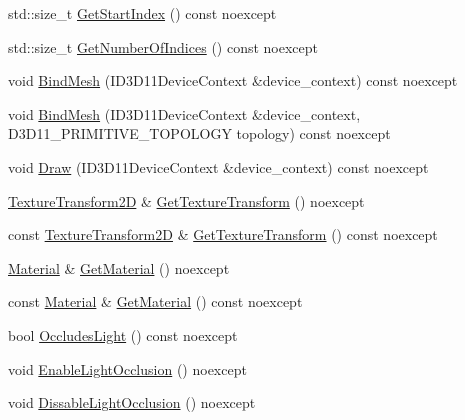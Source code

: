\begin{DoxyCompactItemize}
std\+::size\+\_\+t \mbox{\hyperlink{classmage_1_1rendering_1_1_model_a419dd6f4ea7f32ac3d165ce87d54fb47}{Get\+Start\+Index}} () const noexcept
\item 
std\+::size\+\_\+t \mbox{\hyperlink{classmage_1_1rendering_1_1_model_a4e8445480b07026d2f758d879c8c9d56}{Get\+Number\+Of\+Indices}} () const noexcept
\item 
void \mbox{\hyperlink{classmage_1_1rendering_1_1_model_a78defd61277c92a529c4811f1c7c391b}{Bind\+Mesh}} (I\+D3\+D11\+Device\+Context \&device\+\_\+context) const noexcept
\item 
void \mbox{\hyperlink{classmage_1_1rendering_1_1_model_a7793e3f1fa480cb4dc423845fc4de45f}{Bind\+Mesh}} (I\+D3\+D11\+Device\+Context \&device\+\_\+context, D3\+D11\+\_\+\+P\+R\+I\+M\+I\+T\+I\+V\+E\+\_\+\+T\+O\+P\+O\+L\+O\+GY topology) const noexcept
\item 
void \mbox{\hyperlink{classmage_1_1rendering_1_1_model_aaa10d71022d4f6ac8e51ec95861f3317}{Draw}} (I\+D3\+D11\+Device\+Context \&device\+\_\+context) const noexcept
\item 
\mbox{\hyperlink{classmage_1_1_texture_transform2_d}{Texture\+Transform2D}} \& \mbox{\hyperlink{classmage_1_1rendering_1_1_model_a3b016097dfa0d9da3430acaa680fbb36}{Get\+Texture\+Transform}} () noexcept
\item 
const \mbox{\hyperlink{classmage_1_1_texture_transform2_d}{Texture\+Transform2D}} \& \mbox{\hyperlink{classmage_1_1rendering_1_1_model_a16b34be32b1c45c254a833b21f81f2df}{Get\+Texture\+Transform}} () const noexcept
\item 
\mbox{\hyperlink{classmage_1_1rendering_1_1_material}{Material}} \& \mbox{\hyperlink{classmage_1_1rendering_1_1_model_af6e23f8327e82af4d6c2aa854329608c}{Get\+Material}} () noexcept
\item 
const \mbox{\hyperlink{classmage_1_1rendering_1_1_material}{Material}} \& \mbox{\hyperlink{classmage_1_1rendering_1_1_model_afcdf381e409cc7c7be878a60c1799c1b}{Get\+Material}} () const noexcept
\item 
bool \mbox{\hyperlink{classmage_1_1rendering_1_1_model_ac6238580ce9572b9274bf21852f73455}{Occludes\+Light}} () const noexcept
\item 
void \mbox{\hyperlink{classmage_1_1rendering_1_1_model_a6fc53c4d0d5983ecd2f1910002b4dcfc}{Enable\+Light\+Occlusion}} () noexcept
\item 
void \mbox{\hyperlink{classmage_1_1rendering_1_1_model_a4dc86a18b06ee751f2e208acc21f709e}{Dissable\+Light\+Occlusion}} () noexcept
\item 

\end{DoxyCompactItemize}
